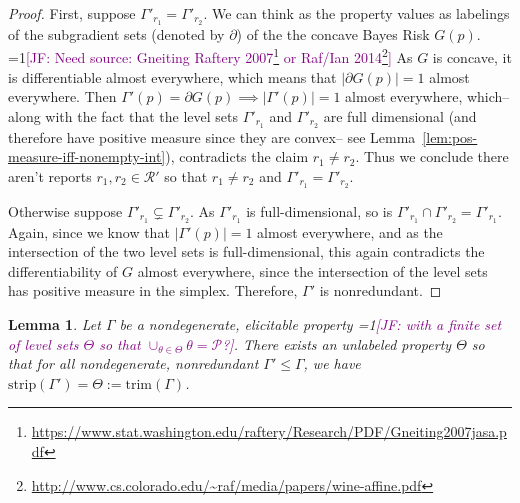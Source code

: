 \documentclass[12pt]{article}
\newcommand{\Comments}{1}
\newcommand{\mynote}[2]{\ifnum\Comments=1\textcolor{#1}{#2}\fi}
\newcommand{\jessie}[1]{\mynote{purple}{[JF: #1]}}
\renewcommand{\P}{\mathcal{P}}
\newcommand{\R}{\mathcal{R}}
\newcommand{\strip}{\mathrm{strip}}
\newtheorem{lemma}{Lemma}
\begin{document}
\begin{proof}
	First, suppose $\Gamma'_{r_1} = \Gamma'_{r_2}$.
	We can think as the property values as labelings of the subgradient sets (denoted by $\partial$) of the the concave Bayes Risk $G(p)$.
	\jessie{Need source: Gneiting Raftery 2007\footnote{\url{https://www.stat.washington.edu/raftery/Research/PDF/Gneiting2007jasa.pdf}} or Raf/Ian 2014\footnote{\url{http://www.cs.colorado.edu/~raf/media/papers/wine-affine.pdf}}}
	As $G$ is concave, it is differentiable almost everywhere, which means that $|\partial G(p)| = 1$ almost everywhere.
	Then $\Gamma'(p) = \partial G(p) \implies |\Gamma'(p)| = 1$ almost everywhere, which-- along with the fact that the level sets $\Gamma'_{r_1}$ and $\Gamma'_{r_2}$ are full dimensional (and therefore have positive measure since they are convex-- see Lemma~\ref{lem:pos-measure-iff-nonempty-int}), contradicts the claim $r_1 \neq r_2$.
	Thus we conclude there aren't reports $r_1, r_2 \in \R'$ so that $r_1 \neq r_2$ and $\Gamma'_{r_1} = \Gamma'_{r_2}$.
	
	
	Otherwise suppose $\Gamma'_{r_1} \subsetneq \Gamma'_{r_2}$.
	As $\Gamma'_{r_1}$ is full-dimensional, so is $\Gamma'_{r_1} \cap \Gamma'_{r_2} = \Gamma'_{r_1}$.
	Again, since we know that $|\Gamma'(p)| = 1$ almost everywhere, and as the intersection of the two level sets is full-dimensional, this again contradicts the differentiability of $G$ almost everywhere, since the intersection of the level sets has positive measure in the simplex.
	Therefore, $\Gamma'$ is nonredundant.

\end{proof}


\begin{lemma}\label{lem:define-trim}
	Let $\Gamma$  be a nondegenerate, elicitable property \jessie{with a finite set of level sets $\Theta$ so that $\cup_{\theta \in \Theta} \theta = \P$?}.
	There exists an unlabeled property $\Theta$ so that for all nondegenerate, nonredundant $\Gamma' \leq \Gamma$, we have $\strip(\Gamma') = \Theta := \text{trim}(\Gamma)$.
\end{lemma}
\end{document}
